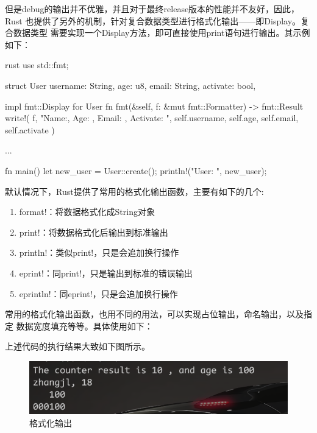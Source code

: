 但是debug的输出并不优雅，并且对于最终release版本的性能并不友好，因此，Rust
也提供了另外的机制，针对复合数据类型进行格式化输出——即Display。复合数据类型
需要实现一个Display方法，即可直接使用print语句进行输出。其示例如下：
\begin{code-block}{rust}
use std::fmt;

struct User {
    username: String,
    age: u8,
    email: String,
    activate: bool,
}

impl fmt::Display for User {
    fn fmt(&self, f: &mut fmt::Formatter) -> fmt::Result {
        write!(
            f,
            "Name:{}, Age: {}, Email: {}, Activate: {}",
            self.username, self.age, self.email, self.activate
        )
    }
}

...

fn main() {
    let new_user = User::create();
    println!("User: {}", new_user);
}
\end{code-block}

默认情况下，Rust提供了常用的格式化输出函数，主要有如下的几个:
\begin{enumerate}
  \item format!：将数据格式化成String对象
  \item print!：将数据格式化后输出到标准输出
  \item println!：类似print!，只是会追加换行操作
  \item eprint!：同print!，只是输出到标准的错误输出
  \item eprintln!：同eprint!，只是会追加换行操作
\end{enumerate}
常用的格式化输出函数，也用不同的用法，可以实现占位输出，命名输出，以及指定
数据宽度填充等等。具体使用如下：
上述代码的执行结果大致如下图所示。
\begin{figure}[H]
  \centering
  \includegraphics[scale=0.6]{rust_format.png}
  \caption{格式化输出}
  \label{fig:rust_format}
\end{figure}

